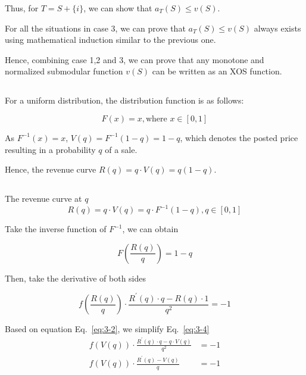 \documentclass[oneside,solution]{seu-ml-assign}
\begin{document}
Thus, for \(T=S+\{i\}\), we can show that \(a_T(S)\leq v(S)\).

                  For all the situations in case \(3\), we can prove that
\(a_T(S)\leq v(S)\) always exists using mathematical induction similar
to the previous one.

Hence, combining case 1,2 and 3, we can prove that any monotone and
normalized submodular function \(v(S)\) can be written as an XOS
function.

\subsection{}
For a uniform distribution, the distribution function is as follows:

\begin{equation}
    F(x)=x,\text{where }x\in[0,1]
\end{equation}

As \(F^{-1}(x)=x\), \(V(q)=F^{-1}(1-q)=1-q\), which denotes the posted
price resulting in a probability \(q\) of a sale.

Hence, the revenue curve \(R(q)=q\cdot V(q)=q(1-q)\).

\subsection{}\label{sec:4-2}
The revenue curve at \(q\)
\begin{equation}
    R(q)=q \cdot V(q)=q\cdot F^{-1}(1-q),q\in[0,1]
    \label{eq:3-2}
\end{equation}

Take the inverse function of \(F^{-1}\), we can obtain

\begin{equation}
    F(\dfrac{R(q)}{q})=1-q
    \label{eq:3-3}
\end{equation}

Then, take the derivative of both sides

\begin{equation}
    f(\frac{R(q)}{q})\cdot \frac{R^{'}(q)\cdot q-R(q)\cdot1}{q^2}=-1
    \label{eq:3-4}
\end{equation}

Based on equation Eq.~\eqref{eq:3-2}, we simplify Eq.~\eqref{eq:3-4} 
\begin{equation}
\begin{aligned}
f(V(q))\cdot\frac{R^{'}(q)\cdot q-q\cdot V(q)}{q^2}&=-1\\
f(V(q))\cdot\frac{R^{'}(q)-V(q)}{q}&=-1
\end{aligned}
\end{equation}
\end{document}

